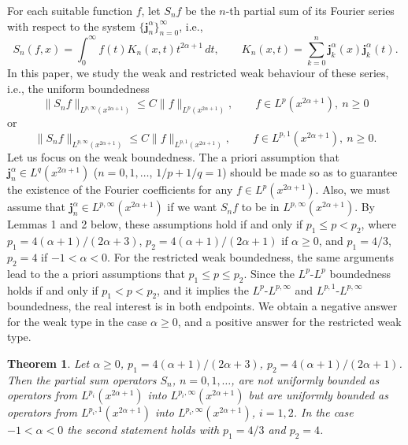 \documentclass{amsart}
\theoremstyle{plain}
\newtheorem*{theorem}{Theorem}
\begin{document}
For each suitable function $f$, let $S_nf$ be the
$n$-th partial sum of its Fourier series with respect to the system
$\{\mathbf{j}_n^\alpha\}_{n=0}^\infty$, i.e.,
\begin{equation*}
   S_n(f,x) = \int_0^{\infty}f(t) K_n(x,t)t^{2\alpha+1}\,dt,
   \qquad
   K_n(x,t)=\sum_{k=0}^n \mathbf{j}_k^{\alpha}(x) \mathbf{j}_k^{\alpha}(t).
\end{equation*}
In this paper, we study the weak and restricted weak behaviour of these
series, i.e., the uniform boundedness
\[
   \| S_n f \|_{L^{p,\infty}(x^{2\alpha+1})}
   \leq  C \| f \|_{L^p(x^{2\alpha+1})},
   \qquad f \in L^p(x^{2\alpha+1}), \ n \geq 0
\]
or
\[
   \| S_n f \|_{L^{p,\infty}(x^{2\alpha+1})}
   \leq  C \| f \|_{L^{p,1}(x^{2\alpha+1})},
   \qquad f \in L^{p,1}(x^{2\alpha+1}), \ n \geq 0.
\]
Let us focus on the weak boundedness. The a priori assumption that
$\mathbf{j}_n^\alpha \in L^q(x^{2\alpha+1})$ ($n=0,1,\dots$, $1/p + 1/q =1$)
should be made so as to guarantee the existence of the Fourier coefficients
for any $f \in L^p(x^{2\alpha+1})$. Also, we must assume that
$\mathbf{j}_n^\alpha \in L^{p,\infty}(x^{2\alpha+1})$ if we want $S_n f$
to be in $L^{p,\infty}(x^{2\alpha+1})$. By Lemmas 1 and 2 below, these
assumptions hold if and only if $p_1 \leq p < p_2$, where $p_1 =
4(\alpha+1)/(2\alpha+3)$, $p_2 = 4(\alpha+1)/(2\alpha+1)$ if $\alpha \geq
0$, and $p_1=4/3$, $p_2 = 4$ if $-1 < \alpha < 0$. For the restricted weak
boundedness, the same arguments lead to the a priori assumptions that $p_1
\leq p \leq p_2$. Since the $L^p$-$L^p$ boundedness holds if and only if
$p_1 < p < p_2$, and it implies the $L^p$-$L^{p,\infty}$ and
$L^{p,1}$-$L^{p,\infty}$ boundedness, the real interest is in both endpoints.
We obtain a negative answer for the weak type in the case $\alpha \geq 0$,
and a positive answer for the restricted weak type.

\begin{theorem}
Let $\alpha \geq 0$, $p_1 = 4(\alpha+1)/(2\alpha+3)$, $p_2 =
4(\alpha+1)/(2\alpha+1)$. Then the partial sum operators $S_n$,
$n=0,1,\dots$, are not uniformly bounded as operators from
$L^{p_i}(x^{2\alpha+1})$ into $L^{p_i,\infty}(x^{2\alpha+1})$ but are
uniformly bounded as operators from $L^{p_i,1}(x^{2\alpha+1})$ into
$L^{p_i,\infty}(x^{2\alpha+1})$, $i=1,2$. In the case $-1 < \alpha < 0$ the
second statement holds with $p_1=4/3$ and $p_2=4$.
\end{theorem}
\end{document}

